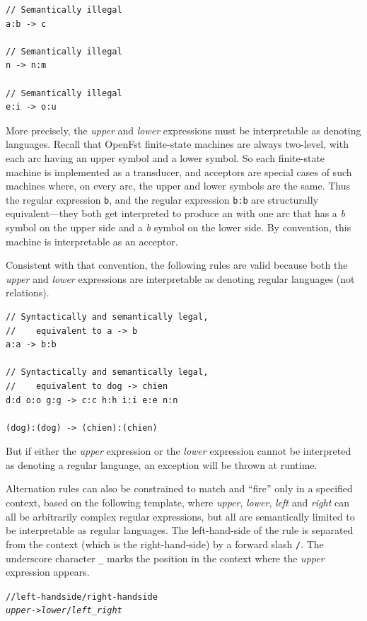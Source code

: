 \begin{Verbatim}
// Semantically illegal
a:b -> c

// Semantically illegal
n -> n:m

// Semantically illegal
e:i -> o:u
\end{Verbatim}


More precisely, the \emph{upper} and \emph{lower} expressions must be interpretable as denoting
languages.  Recall that OpenFst finite-state machines are always two-level, with each arc having an
upper symbol and a lower symbol.  So each finite-state machine is implemented as a transducer, and
acceptors are special cases of such machines where, on every arc, the upper and lower symbols are the
same.  Thus the regular expression \texttt{b}, and the regular expression \texttt{b:b} are structurally
equivalent---they both get interpreted to produce an \fsm{} with one arc that has a \emph{b} symbol on
the upper side and a \emph{b} symbol on the lower side.  By convention, this machine is interpretable
as an acceptor.

Consistent with that convention, the following rules are valid because both the \emph{upper} and
\emph{lower} expressions are interpretable as denoting regular languages (not relations).

\begin{Verbatim}
// Syntactically and semantically legal, 
//    equivalent to a -> b
a:a -> b:b

// Syntactically and semantically legal, 
//    equivalent to dog -> chien
d:d o:o g:g -> c:c h:h i:i e:e n:n

(dog):(dog) -> (chien):(chien)
\end{Verbatim}

\noindent
But if either the \emph{upper} expression or the \emph{lower} expression cannot be interpreted as
denoting a regular language, an exception will be thrown at runtime.

Alternation rules can also be constrained to match and ``fire'' only in a specified context, based on the following
template, where \emph{upper}, \emph{lower}, \emph{left} and \emph{right} can all be arbitrarily complex regular
expressions, but all are semantically limited to be interpretable as regular languages.  The left-hand-side of the rule
is separated from the context (which is the right-hand-side) by a forward slash \texttt{/}. The underscore character
\texttt{\_} marks the position in the context where the \emph{upper} expression appears.
 

\begin{alltt}
// left-hand side / right-hand side
\emph{upper} -> \emph{lower} / \emph{left} _ \emph{right}
\end{alltt}

